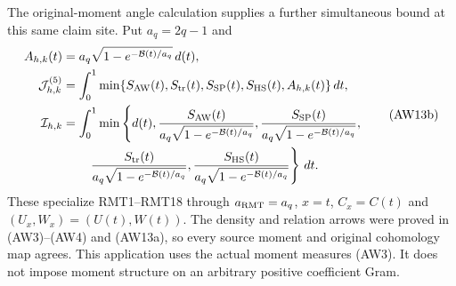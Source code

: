 The original-moment angle calculation supplies a further simultaneous
bound at this same claim site. Put $a_q=2q-1$ and
\[
 \begin{aligned}
 A_{h,k}(t)&=a_q\sqrt{1-e^{-\mathcal B(t)/a_q}}\,d(t),\\
 \mathcal J_{h,k}^{(5)}
   &=\int_0^1\min\{S_{\rm AW}(t),S_{\rm tr}(t),S_{\rm SP}(t),S_{\rm HS}(t),A_{h,k}(t)\}\,dt,\\
 \mathcal I_{h,k}
   &=\int_0^1\min\left\{d(t),
   \frac{S_{\rm AW}(t)}{a_q\sqrt{1-e^{-\mathcal B(t)/a_q}}},
   \frac{S_{\rm SP}(t)}{a_q\sqrt{1-e^{-\mathcal B(t)/a_q}}},\right.
 \\
 &\hspace{2em}\left.   \frac{S_{\rm tr}(t)}{a_q\sqrt{1-e^{-\mathcal B(t)/a_q}}},
   \frac{S_{\rm HS}(t)}{a_q\sqrt{1-e^{-\mathcal B(t)/a_q}}}\right\}\,dt .
 \end{aligned}
 \tag{AW13b}
\]
These specialize RMT1--RMT18 through $a_{\rm RMT}=a_q$, $x=t$, $C_x=C(t)$ and
$(U_x,W_x)=(U(t),W(t))$. The density and relation arrows were
proved in (AW3)--(AW4) and (AW13a), so every source moment and original
cohomology map agrees. This application uses the actual moment
measures (AW3). It does not impose moment structure on an
arbitrary positive coefficient Gram.


